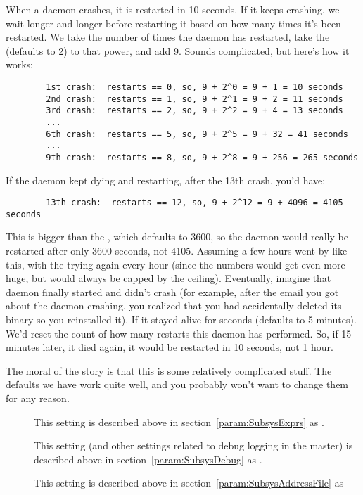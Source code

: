 When a daemon crashes, it is restarted in 10 seconds.  If it keeps
crashing, we wait longer and longer before restarting it based on how
many times it's been restarted.  We take the number of times the
daemon has restarted, take the 
(defaults to 2) to that power, and add 9.  Sounds complicated, but
here's how it works:

\begin{verbatim}
        1st crash:  restarts == 0, so, 9 + 2^0 = 9 + 1 = 10 seconds
        2nd crash:  restarts == 1, so, 9 + 2^1 = 9 + 2 = 11 seconds
        3rd crash:  restarts == 2, so, 9 + 2^2 = 9 + 4 = 13 seconds
        ...
        6th crash:  restarts == 5, so, 9 + 2^5 = 9 + 32 = 41 seconds
        ...
        9th crash:  restarts == 8, so, 9 + 2^8 = 9 + 256 = 265 seconds
\end{verbatim}

If the daemon kept dying and restarting, after the 13th crash, you'd
have:

\begin{verbatim}
        13th crash:  restarts == 12, so, 9 + 2^12 = 9 + 4096 = 4105 seconds
\end{verbatim}

This is bigger than the , which
defaults to 3600, so the daemon would really be restarted after only
3600 seconds, not 4105.  Assuming a few hours went by like this, with
the  trying again every hour (since the numbers would
get even more huge, but would always be capped by the ceiling).
Eventually, imagine that daemon finally started and didn't crash (for
example, after the email you got about the daemon crashing, you
realized that you had accidentally deleted its binary so you
reinstalled it).  If it stayed alive for
 seconds (defaults to 5 minutes).  We'd
reset the count of how many restarts this daemon has performed.  So,
if 15 minutes later, it died again, it would be restarted in 10
seconds, not 1 hour.

The moral of the story is that this is some relatively complicated
stuff.  The defaults we have work quite well, and you probably 
won't want to change them for any reason.

\begin{description}

\item[] \label{param:MasterExprs} This setting is
  described above in section~\ref{param:SubsysExprs} as
  .

\item[] \label{param:MasterDebug} This setting
  (and other settings related to debug logging in the master) is
  described above in section~\ref{param:SubsysDebug} as
  .

\item[] \label{param:MasterAddressFile}
  This setting is described above in
  section~\ref{param:SubsysAddressFile} as

\end{description}

